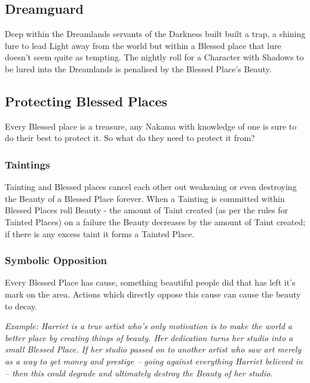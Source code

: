 	
\subsection*{Dreamguard}

Deep within the Dreamlands servants of the Darkness built built a trap, a shining lure to lead Light away from the world but within a Blessed place that lure doesn’t seem quite as tempting. The nightly roll for a Character with Shadows to be lured into the Dreamlands is penalised by the Blessed Place's Beauty. 	

\subsection*{Protecting Blessed Places}

Every Blessed place is a treasure, any Nakama with knowledge of one is sure to do their best to protect it. So what do they need to protect it from? 

\subsubsection*{Taintings}
Tainting and Blessed places cancel each other out weakening or even destroying the Beauty of a Blessed Place forever. When a Tainting is committed within Blessed Places roll Beauty - the amount of Taint created (as per the rules for Tainted Places) on a failure the Beauty decreases by the amount of Taint created; if there is any excess taint it forms a Tainted Place. 
\subsubsection*{Symbolic Opposition}
Every Blessed Place has cause, something beautiful people did that has left it's mark on the area. Actions which directly oppose this cause can cause the beauty to decay.

\textit{Example: Harriet is a true artist who's only motivation is to make the world a better place by creating things of beauty. Her dedication turns her studio into a small Blessed Place. If her studio passed on to another artist who saw art merely as a way to get money and prestige – going against everything Harriet believed in – then this could degrade and ultimately destroy the Beauty of her studio.}


